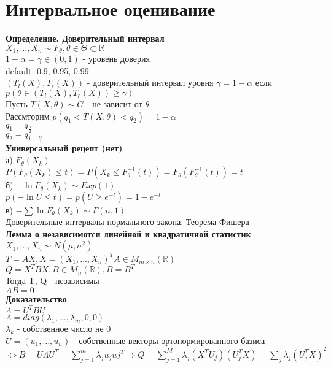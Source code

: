 \documentclass{article}
\newcommand\0{\mathbb{0}}
\newcommand\1{\mathbb{1}}
\newcommand{\Rto}{\Rightarrow}
\newcommand{\LRto}{\Leftrightarrow}
\begin{document}
\section{Интервальное оценивание}
\textbf{Определение. Доверительный интервал}\\
$X_1, \dots, X_n \sim F_\theta, \theta \in \Theta \subset \mathbb{R}$\\
$1 - \alpha = \gamma \in (0, 1)$ - уровень доверия\\
default: 0.9, 0.95, 0.99\\
$(T_l(X), T_r(X))$ - доверительный интервал уровня $\gamma = 1 - \alpha$ если $p(\theta \in (T_l(X), T_r(X)) \geq \gamma)$\\
Пусть $T(X, \theta) \sim G$ - не зависит от $\theta$\\
Рассмторим $p(q_1 < T(X, \theta) < q_2) = 1 - \alpha$\\
$q_1 = q_{\frac{\alpha}{2}}$\\
$q_2 = q_{1 - \frac{\alpha}{2}}$\\
\textbf{Универсальный рецепт (нет)}\\
а) $F_\theta(X_k)$\\
$P(F_\theta(X_k) \leq t) = P(X_k \leq F_\theta^{-1}(t)) = F_\theta(F_\theta^{-1}(t)) = t$\\
б) $-\ln{F_\theta(X_k)} \sim Exp(1)$\\
$p(-\ln{U} \leq t) = p(U \geq e^{-t}) = 1 - e^{-t}$\\
в) $-\displaystyle\sum \ln{F_\theta(X_k)} \sim \Gamma(n, 1)$\\
Доверительные интервалы нормального закона. Теорема Фишера\\
\textbf{Лемма о независимотси линейной и квадратичной статистик}\\
$X_1, \dots, X_n \sim N(\mu, \sigma^2)$\\
$T = AX, X = (X_1, \dots, X_n)^T A \in M_{m \times n}(\mathbb{R})$\\
$Q = X^T B X, B \in M_n(\mathbb{R}), B = B^T$\\
Тогда T, Q - независимы\\
$AB = 0$\\
\textbf{Доказательство}\\
$\Lambda = U^TBU$\\
$\Lambda = diag(\lambda_1, \dots, \lambda_m, 0, 0)$\\
$\lambda_k$ - собственное число не 0\\
$U = (u_1, \dots, u_n)$ - собственные векторы ортонормированного базиса $\LRto B = U\Lambda U^T = \displaystyle\sum_{j = 1}^m \lambda_j u_j uj^T \Rto Q = \displaystyle\sum_{j = 1}^M \lambda_j (X^TU_j)(U_j^TX) = \displaystyle\sum_j \lambda_j (U_j^T X)^2$\\
\end{document}
